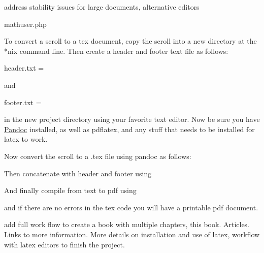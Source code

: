 address stability issues for large documents, alternative editors

mathuser.php

To convert a scroll to a tex document, copy the scroll into a new
directory at the *nix command line. Then create a header and footer text
file as follows:

header.txt =

and

footer.txt =

in the new project directory using your favorite text editor. Now be
sure you have \href{https://pandoc.org/}{Pandoc} installed, as well as
pdflatex, and any stuff that needs to be installed for latex to work.

Now convert the scroll to a .tex file using pandoc as follows:

Then concatenate with header and footer using

And finally compile from text to pdf using

and if there are no errors in the tex code you will have a printable pdf
document.

add full work flow to create a book with multiple chapters, this book.
Articles. Links to more information. More details on installation and
use of latex, workflow with latex editors to finish the project.
